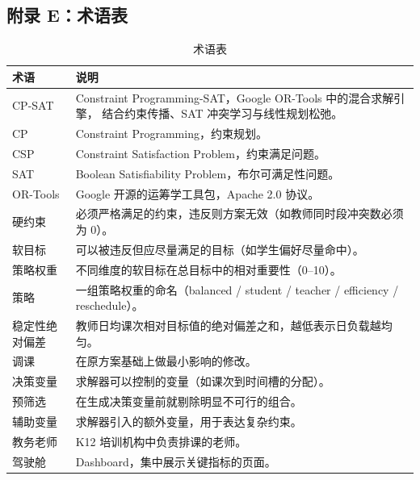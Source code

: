 \subsection*{附录 E：术语表}

\begin{table}[h]
  \centering
  \caption{术语表}
  \label{tab:glossary}
  \small
  \begin{tabularx}{\textwidth}{L{3.2cm} Y}
    \toprule
    \textbf{术语} & \textbf{说明} \\
    \midrule
    CP-SAT
      & Constraint Programming-SAT，Google OR-Tools 中的混合求解引擎，
        结合约束传播、SAT 冲突学习与线性规划松弛。\\
    CP & Constraint Programming，约束规划。\\
    CSP & Constraint Satisfaction Problem，约束满足问题。\\
    SAT & Boolean Satisfiability Problem，布尔可满足性问题。\\
    OR-Tools & Google 开源的运筹学工具包，Apache 2.0 协议。\\
    硬约束
      & 必须严格满足的约束，违反则方案无效（如教师同时段冲突数必须为 0）。\\
    软目标
      & 可以被违反但应尽量满足的目标（如学生偏好尽量命中）。\\
    策略权重
      & 不同维度的软目标在总目标中的相对重要性（0--10）。\\
    策略
      & 一组策略权重的命名（balanced / student / teacher / efficiency / reschedule）。\\
    稳定性绝对偏差
      & 教师日均课次相对目标值的绝对偏差之和，越低表示日负载越均匀。\\
    调课
      & 在原方案基础上做最小影响的修改。\\
    决策变量
      & 求解器可以控制的变量（如课次到时间槽的分配）。\\
    预筛选
      & 在生成决策变量前就剔除明显不可行的组合。\\
    辅助变量
      & 求解器引入的额外变量，用于表达复杂约束。\\
    教务老师
      & K12 培训机构中负责排课的老师。\\
    驾驶舱
      & Dashboard，集中展示关键指标的页面。\\
    \bottomrule
  \end{tabularx}
\end{table}
